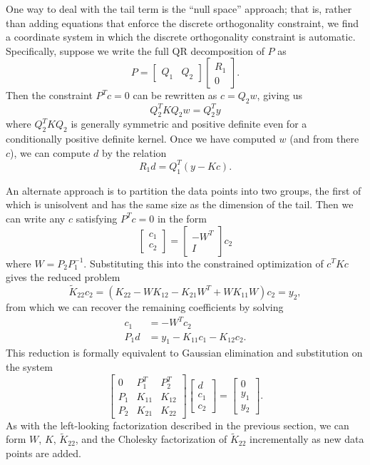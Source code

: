 \documentclass[12pt, leqno]{article} %
\begin{document}
One way to deal with the tail term is the ``null space'' approach;
that is, rather than adding equations that enforce the discrete
orthogonality constraint, we find a coordinate system in which the
discrete orthogonality constraint is automatic.  Specifically, suppose
we write the full QR decomposition of $P$ as
\[
  P = \begin{bmatrix} Q_1 & Q_2 \end{bmatrix}
      \begin{bmatrix} R_1 \\ 0 \end{bmatrix}.
\]
Then the constraint $P^T c = 0$ can be rewritten as $c = Q_2 w$,
giving us
\[
  Q_2^T K Q_2 w = Q_2^T y
\]
where $Q_2^T K Q_2$ is generally symmetric and positive definite even
for a conditionally positive definite kernel.  Once we have computed
$w$ (and from there $c$), we can compute $d$ by the relation
\[
  R_1 d = Q_1^T (y-Kc).
\]

An alternate approach is to partition the data points into two
groups, the first of which is unisolvent and has the same size as
the dimension of the tail.
Then we can write any $c$ satisfying $P^T c = 0$ in the form
\[
  \begin{bmatrix} c_1 \\ c_2 \end{bmatrix} =
  \begin{bmatrix} -W^T \\ I \end{bmatrix} c_2
\]
where $W = P_2 P_1^{-1}$.  Substituting this into the constrained
optimization of $c^T K c$ gives the reduced problem
\[
  \tilde{K}_{22} c_2 = (K_{22} - W K_{12} - K_{21} W^T + W K_{11} W) c_2 = y_2,
\]
from which we can recover the remaining coefficients by solving
\begin{align*}
  c_1   &= -W^T c_2 \\
  P_1 d & = y_1 - K_{11} c_1 - K_{12} c_2.
\end{align*}
This reduction is formally equivalent to Gaussian elimination and
substitution on the system
\[
  \begin{bmatrix}
    0 & P_1^T & P_2^T \\
    P_1 & K_{11} & K_{12} \\
    P_2 & K_{21} & K_{22}
  \end{bmatrix}
  \begin{bmatrix} d \\ c_1 \\ c_2 \end{bmatrix} =
  \begin{bmatrix} 0 \\ y_1 \\ y_2 \end{bmatrix}.
\]
As with the left-looking factorization described in the previous
section, we can form $W$, $K$, $\tilde{K}_{22}$, and the Cholesky
factorization of $\tilde{K}_{22}$ incrementally as new data points are added.
\end{document}
